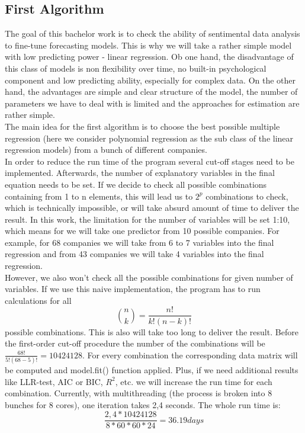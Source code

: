 \documentclass[12pt, a4paper]{article}
\begin{document}
\subsection{First Algorithm}
The goal of this bachelor work is to check the ability of sentimental data analysis to fine-tune forecasting models. This is why we will take a rather simple model with low predicting power - linear regression. Ob one hand, the disadvantage of this class of models is non flexibility over time, no built-in psychological component and low predicting ability, especially for complex data. On the other hand, the advantages are simple and clear structure of the model, the number of parameters we have to deal with is limited and the approaches for estimation are rather simple.\\
The main idea for the first algorithm is to choose the best possible multiple regression (here we consider polynomial regression as the sub class of the linear regression models) from a bunch of different companies.\\
In order to reduce the run time of the program several cut-off stages need to be implemented. Afterwards, the number of explanatory variables in the final equation needs to be set. If we decide to check all possible combinations containing from 1 to n elements, this will lead us to $2^p$ combinations to check, which is technically impossible, or will take absurd amount of time to deliver the result. In this work, the limitation for the number of variables will be set 1:10, which means for we will take one predictor from 10 possible companies. For example, for 68 companies we will take from 6 to 7 variables into the final regression and from 43 companies we will take 4 variables into the final regression.\\
However, we also won't check all the possible combinations for given number of variables. If we use this naive implementation, the program has to run calculations for all \[\binom{n}{k} = \frac{n!}{k!(n-k)!}\] possible combinations. This is also will take too long to deliver the result. Before the first-order cut-off procedure the number of the combinations will be $\frac{68!}{5!(68-5)!} = 10424128$. For every combination the corresponding data matrix will be computed and model.fit() function applied. Plus, if we need additional results like LLR-test, AIC or BIC, $R^2$, etc. we will increase the run time for each combination. Currently, with multithreading (the process is broken into 8 bunches for 8 cores), one iteration takes 2,4 seconds. The whole run time is: \[\frac{2,4*10424128}{8*60*60*24} = 36.19 days\]
\end{document}
